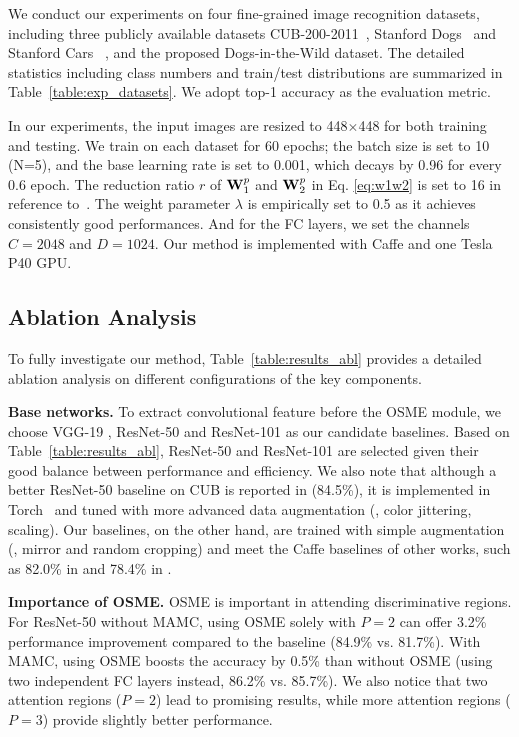 \documentclass[runningheads]{llncs}
\begin{document}
We conduct our experiments on four fine-grained image recognition datasets, including three publicly available datasets CUB-200-2011~\cite{welinder2010caltech}, Stanford Dogs~\cite{khosla2011novel} and Stanford Cars~ \cite{krause20133d}, and the proposed Dogs-in-the-Wild dataset.
The detailed statistics including class numbers and train/test distributions are summarized in Table~\ref{table:exp_datasets}.
We adopt top-1 accuracy as the evaluation metric.

In our experiments, the input images are resized to 448$\times$448 for both training and testing.
We train on each dataset for 60 epochs; the batch size is set to 10 (N=5), and the base learning rate is set to 0.001, which decays by 0.96 for every 0.6 epoch.
The reduction ratio $r$ of $\mathbf{W}_1^p$ and $\mathbf{W}_2^p$ in Eq. \ref{eq:w1w2} is set to 16 in reference to~\cite{hu2017squeeze}.
The weight parameter $\lambda$ is empirically set to 0.5 as it achieves consistently good performances.
And for the FC layers, we set the channels $C=2048$ and $D=1024$.
Our method is implemented with Caffe \cite{jia2014caffe} and one Tesla P40 GPU.



\vspace{-.1in}
\subsection{Ablation Analysis}
To fully investigate our method, Table~\ref{table:results_abl} provides a detailed ablation analysis on different configurations of the key components.

\textbf{Base networks.} To extract convolutional feature before the OSME module, we choose VGG-19 \cite{simonyan2014very}, ResNet-50 and ResNet-101 \cite{he2016deep} as our candidate baselines. Based on Table~\ref{table:results_abl}, ResNet-50 and ResNet-101 are selected given their good balance between performance and efficiency.
We also note that although a better ResNet-50 baseline on CUB is reported in \cite{li2017dynamic} (84.5\%), it is implemented in Torch~\cite{collobert2011torch7} and tuned with more advanced data augmentation (\eg, color jittering, scaling).
Our baselines, on the other hand, are trained with simple augmentation (\eg, mirror and random cropping) and meet the Caffe baselines of other works, such as 82.0\% in \cite{liu2016fully} and 78.4\% in \cite{cui2017kernel}.

\textbf{Importance of OSME.} OSME is important in attending discriminative regions.
For ResNet-50 without MAMC, using OSME solely with $P=2$ can offer 3.2\% performance improvement compared to the baseline (84.9\% vs. 81.7\%).
With MAMC, using OSME boosts the accuracy by 0.5\% than without OSME (using two independent FC layers instead, 86.2\% vs. 85.7\%).
We also notice that two attention regions ($P=2$) lead to promising results, while more attention regions ($P=3$) provide slightly better performance.
\end{document}
